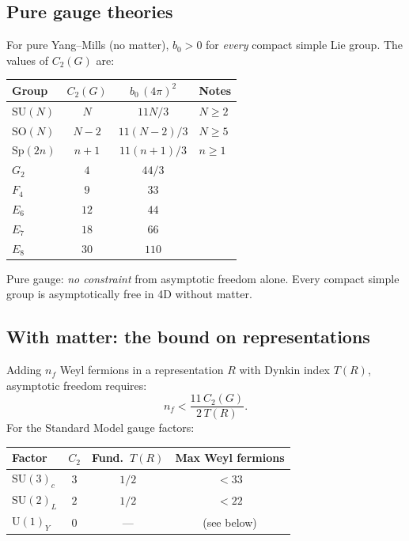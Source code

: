 \documentclass[12pt]{article}
\theoremstyle{definition}
\theoremstyle{remark}
\newcommand{\SU}{\mathrm{SU}}
\newcommand{\SO}{\mathrm{SO}}
\newcommand{\Sp}{\mathrm{Sp}}
\newcommand{\UU}{\mathrm{U}}
\begin{document}
\subsection{Pure gauge theories}

For pure Yang--Mills (no matter), $b_0 > 0$ for \emph{every}
compact simple Lie group.  The values of $C_2(G)$ are:

\begin{center}
\renewcommand{\arraystretch}{1.3}
\begin{tabular}{lccl}
\toprule
Group & $C_2(G)$ & $b_0\,(4\pi)^2$ & Notes \\
\midrule
$\SU(N)$ & $N$ & $11N/3$ & $N \geq 2$ \\
$\SO(N)$ & $N-2$ & $11(N-2)/3$ & $N \geq 5$ \\
$\Sp(2n)$ & $n+1$ & $11(n+1)/3$ & $n \geq 1$ \\
$G_2$ & $4$ & $44/3$ & \\
$F_4$ & $9$ & $33$ & \\
$E_6$ & $12$ & $44$ & \\
$E_7$ & $18$ & $66$ & \\
$E_8$ & $30$ & $110$ & \\
\bottomrule
\end{tabular}
\end{center}

Pure gauge: \emph{no constraint} from asymptotic freedom alone.
Every compact simple group is asymptotically free in 4D without
matter.

\subsection{With matter: the bound on representations}

Adding $n_f$ Weyl fermions in a representation $R$ with
Dynkin index $T(R)$, asymptotic freedom requires:
\begin{equation}\label{eq:AF_bound}
  n_f < \frac{11\,C_2(G)}{2\,T(R)}.
\end{equation}
For the Standard Model gauge factors:

\begin{center}
\renewcommand{\arraystretch}{1.3}
\begin{tabular}{lccc}
\toprule
Factor & $C_2$ & Fund.\ $T(R)$ & Max Weyl fermions \\
\midrule
$\SU(3)_c$ & $3$ & $1/2$ & $< 33$ \\
$\SU(2)_L$ & $2$ & $1/2$ & $< 22$ \\
$\UU(1)_Y$ & $0$ & --- & (see below) \\
\bottomrule
\end{tabular}
\end{center}
\end{document}
